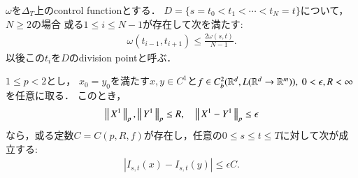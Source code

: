 	\begin{screen}
		\begin{lem}\label{lem:control_function_min}
			$\omega$を$\Delta_T$上のcontrol functionとする．
			$D = \{s = t_0 < t_1 < \cdots < t_N= t\}$について，$N \geq 2$の場合
			或る$1 \leq i \leq N-1$が存在して次を満たす:
			\begin{align}
				\omega(t_{i-1},t_{i+1})
				\leq \frac{2 \omega(s,t)}{N-1}.
			\end{align}
			以後この$t_i$を$D$のdivision pointと呼ぶ．
		\end{lem}
	\end{screen}
	
	\begin{screen}
		\begin{thm}\label{thm:continuity_theorem_1}
			$1 \leq p < 2$とし，
			$x_0 = y_0$を満たす$x,y \in C^1$と$f \in C^2_b(\mathbb{R}^d,L(\mathbb{R}^d \rightarrow \mathbb{R}^m)),\ 0 < \epsilon, R < \infty$を任意に取る．
			このとき，
			\begin{align}
				\left\|\, X^1\, \right\|_{p},\left\|\, Y^1\, \right\|_{p} \leq R,
				\quad \left\|\, X^1 - Y^1\, \right\|_{p} \leq \epsilon
			\end{align}
			なら，或る定数$C = C(p,R,f)$が存在し，任意の$0 \leq s \leq t \leq T$に対して次が成立する:
			\begin{align}
				\left| I_{s,t}(x) - I_{s,t}(y) \right| \leq \epsilon C.
			\end{align}
		\end{thm}
	\end{screen}
	
